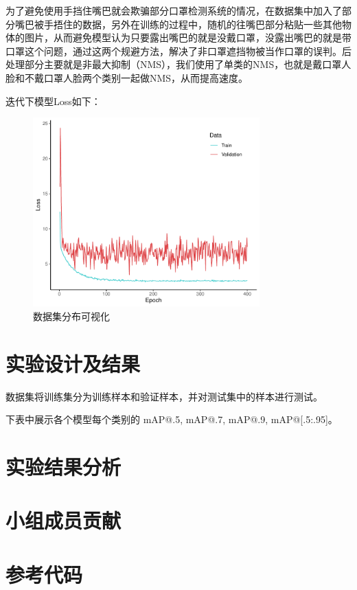 \documentclass[journal,transmag]{IEEEtran}
\begin{document}
为了避免使用手挡住嘴巴就会欺骗部分口罩检测系统的情况，在数据集中加入了部分嘴巴被手捂住的数据，另外在训练的过程中，随机的往嘴巴部分粘贴一些其他物体的图片，从而避免模型认为只要露出嘴巴的就是没戴口罩，没露出嘴巴的就是带口罩这个问题，通过这两个规避方法，解决了非口罩遮挡物被当作口罩的误判。后处理部分主要就是非最大抑制（NMS），我们使用了单类的NMS，也就是戴口罩人脸和不戴口罩人脸两个类别一起做NMS，从而提高速度。

迭代下模型Loss如下：
\begin{figure}[h]
\centering
\includegraphics[width=3.44in]{Ssdloss.pdf}
\caption{数据集分布可视化}
\end{figure}
\section{实验设计及结果}
数据集将训练集分为训练样本和验证样本，并对测试集中的样本进行测试。

下表中展示各个模型每个类别的 mAP@.5, mAP@.7, mAP@.9, mAP@[.5:.95]。

\section{实验结果分析}

\section{小组成员贡献}

\section{参考代码}
\end{document}
